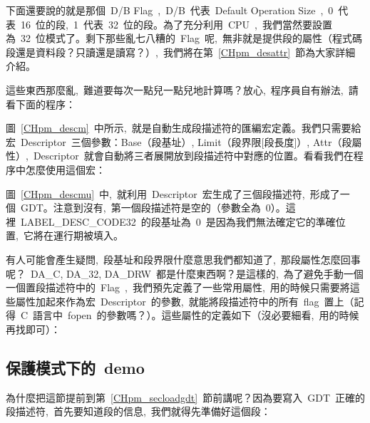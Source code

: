 下面還要說的就是那個~D/B Flag~,~D/B~代表~Default Operation Size~,~0~代表~16~位的段,~1~代表~32~位的段。為了充分利用~CPU~,~我們當然要設置為~32~位模式了。剩下那些亂七八糟的~Flag~呢,~無非就是提供段的屬性（程式碼段還是資料段？只讀還是讀寫？）,~我們將在第~\ref{CHpm_desattr}~節為大家詳細介紹。

這些東西那麼亂,~難道要每次一點兒一點兒地計算嗎？放心,~程序員自有辦法,~請看下面的程序：

\label{CHpm_descm}

圖~\ref{CHpm_descm}~中所示,~就是自動生成段描述符的匯編宏定義。我們只需要給宏~Descriptor~三個參數：Base（段基址）, Limit（段界限[段長度]）, Attr（段屬性）,~Descriptor~就會自動將三者展開放到段描述符中對應的位置。看看我們在程序中怎麼使用這個宏：

\label{CHpm_descmu}

圖~\ref{CHpm_descmu}~中,~就利用~Descriptor~宏生成了三個段描述符,~形成了一個~GDT。注意到沒有,~第一個段描述符是空的（參數全為~0）。這裡~LABEL\_DESC\_CODE32~的段基址為~0~是因為我們無法確定它的準確位置,~它將在運行期被填入。

有人可能會產生疑問,~段基址和段界限什麼意思我們都知道了,~那段屬性怎麼回事呢？~DA\_C, DA\_32, DA\_DRW~都是什麼東西啊？是這樣的,~為了避免手動一個一個置段描述符中的~Flag~,~我們預先定義了一些常用屬性,~用的時候只需要將這些屬性加起來作為宏~Descriptor~的參數,~就能將段描述符中的所有~flag~置上（記得~C~語言中~fopen~的參數嗎？）。這些屬性的定義如下（沒必要細看,~用的時候再找即可）：

\label{CHpm_segattr}

\subsection{保護模式下的~demo}

為什麼把這節提前到第~\ref{CHpm_secloadgdt}~節前講呢？因為要寫入~GDT~正確的段描述符,~首先要知道段的信息,~我們就得先準備好這個段：

